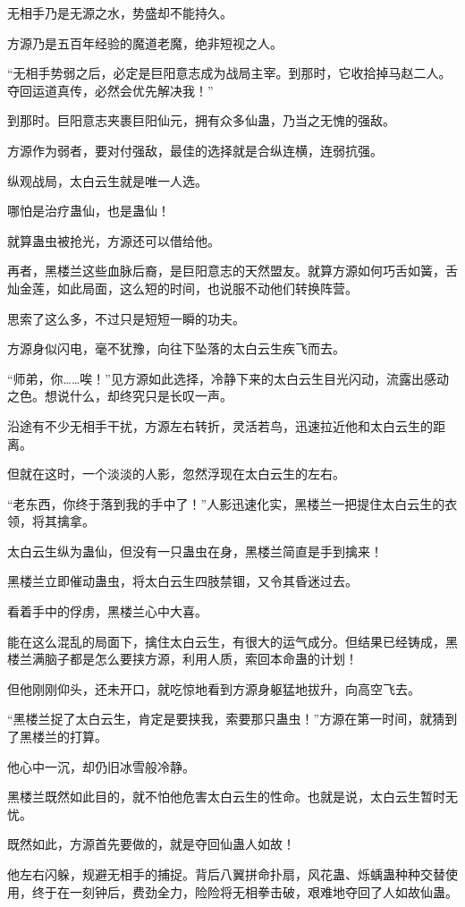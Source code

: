 \begin{this_body}
无相手乃是无源之水，势盛却不能持久。

方源乃是五百年经验的魔道老魔，绝非短视之人。

“无相手势弱之后，必定是巨阳意志成为战局主宰。到那时，它收拾掉马赵二人。夺回运道真传，必然会优先解决我！”

到那时。巨阳意志夹裹巨阳仙元，拥有众多仙蛊，乃当之无愧的强敌。

方源作为弱者，要对付强敌，最佳的选择就是合纵连横，连弱抗强。

纵观战局，太白云生就是唯一人选。

哪怕是治疗蛊仙，也是蛊仙！

就算蛊虫被抢光，方源还可以借给他。

再者，黑楼兰这些血脉后裔，是巨阳意志的天然盟友。就算方源如何巧舌如簧，舌灿金莲，如此局面，这么短的时间，也说服不动他们转换阵营。

思索了这么多，不过只是短短一瞬的功夫。

方源身似闪电，毫不犹豫，向往下坠落的太白云生疾飞而去。

“师弟，你……唉！”见方源如此选择，冷静下来的太白云生目光闪动，流露出感动之色。想说什么，却终究只是长叹一声。

沿途有不少无相手干扰，方源左右转折，灵活若鸟，迅速拉近他和太白云生的距离。

但就在这时，一个淡淡的人影，忽然浮现在太白云生的左右。

“老东西，你终于落到我的手中了！”人影迅速化实，黑楼兰一把提住太白云生的衣领，将其擒拿。

太白云生纵为蛊仙，但没有一只蛊虫在身，黑楼兰简直是手到擒来！

黑楼兰立即催动蛊虫，将太白云生四肢禁锢，又令其昏迷过去。

看着手中的俘虏，黑楼兰心中大喜。

能在这么混乱的局面下，擒住太白云生，有很大的运气成分。但结果已经铸成，黑楼兰满脑子都是怎么要挟方源，利用人质，索回本命蛊的计划！

但他刚刚仰头，还未开口，就吃惊地看到方源身躯猛地拔升，向高空飞去。

“黑楼兰捉了太白云生，肯定是要挟我，索要那只蛊虫！”方源在第一时间，就猜到了黑楼兰的打算。

他心中一沉，却仍旧冰雪般冷静。

黑楼兰既然如此目的，就不怕他危害太白云生的性命。也就是说，太白云生暂时无忧。

既然如此，方源首先要做的，就是夺回仙蛊人如故！

他左右闪躲，规避无相手的捕捉。背后八翼拼命扑扇，风花蛊、烁蝺蛊种种交替使用，终于在一刻钟后，费劲全力，险险将无相拳击破，艰难地夺回了人如故仙蛊。


\end{this_body}

